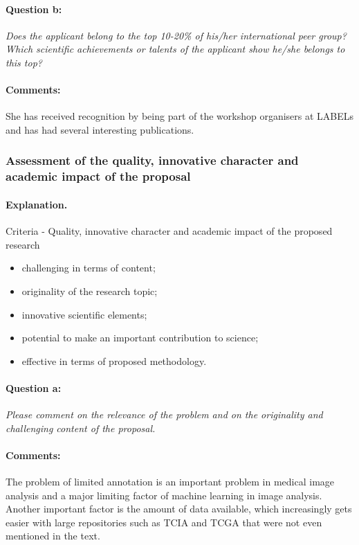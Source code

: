 \documentclass[serif, twocolumn, numeric, rga]{jote-article}
\begin{document}
\paragraph{Question b:}
\textit{Does the applicant belong to the top 10-20\% of his/her international peer group? Which scientific achievements or talents of the applicant show he/she belongs to this top?}
\paragraph{Comments:}
She has received recognition by being part of the workshop organisers at LABELs and has had several interesting publications.

\subsubsection*{Assessment of the quality, innovative character and academic impact of the proposal}
\paragraph{Explanation.}
Criteria - Quality, innovative character and academic impact of the proposed research 
\begin{itemize}\item challenging in terms of content; \item originality of the research topic; \item innovative scientific elements; \item potential to make an important contribution to science; \item effective in terms of proposed methodology.
\end{itemize}
\paragraph{Question a:}
\textit{Please comment on the relevance of the problem and on the originality and challenging content of the proposal.}
\paragraph{Comments:}
The problem of limited annotation is an important problem in medical image analysis and a major limiting factor of machine learning in image analysis. Another important factor is the amount of data available, which increasingly gets easier with large repositories such as TCIA and TCGA that were not even mentioned in the text.
\end{document}
